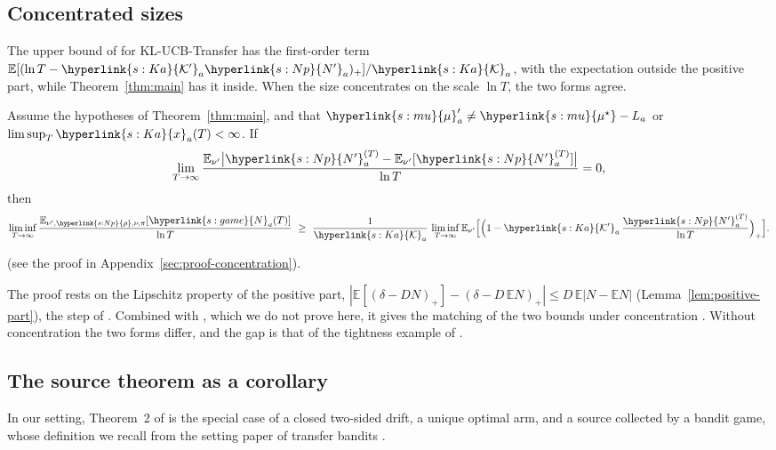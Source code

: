 \documentclass[11pt]{article}
\newcommand{\sy}[2]{\hyperlink{#1}{#2}}
\newcommand{\E}{\mathbb{E}}
\newcommand{\mean}{\sy{s:mu}{\mu}}
\newcommand{\ms}{\sy{s:mu}{\mu^{\star}}}
\newcommand{\Np}{\sy{s:Np}{N'}}
\newcommand{\rhos}{\sy{s:Np}{\rho}}
\newcommand{\Nc}{\sy{s:game}{N}}
\newcommand{\Ka}{\sy{s:Ka}{\mathcal{K}}}
\newcommand{\Kp}{\sy{s:Ka}{\mathcal{K}'}}
\newcommand{\xr}{\sy{s:Ka}{x}}
\begin{document}
\subsection{Concentrated sizes}

The upper bound of \citet[Theorem~3(i)]{PMRM26} for KL-UCB-Transfer has the first-order term
$\E[(\ln T-\Kp_a\Np_a)_+]/\Ka_a$, with the expectation outside the positive part, while
Theorem~\ref{thm:main} has it inside. When the size concentrates on the scale $\ln T$, the two forms
agree.

\begin{corollary}\label{cor:concentration}
Assume the hypotheses of Theorem~\ref{thm:main}, and that $\mean'_a\ne\ms-L_a$ or
$\limsup_T\xr_a(T)<\infty$. If
\begin{equation*}
\lim_{T\to\infty}\frac{\E_{\nu'}\big|\Np^{(T)}_a-\E_{\nu'}[\Np^{(T)}_a]\big|}{\ln T}=0,
\end{equation*}
then
\begin{equation*}
\liminf_{T\to\infty}\frac{\E_{\nu',\rhos,\nu,\pi}[\Nc_a(T)]}{\ln T}\ \ge\
\frac{1}{\Ka_a}\,\liminf_{T\to\infty}\E_{\nu'}\Big[\Big(1-\Kp_a\,\frac{\Np^{(T)}_a}{\ln T}\Big)_+\Big].
\end{equation*}
\end{corollary}
(see the proof in Appendix~\ref{sec:proof-concentration}).

The proof rests on the Lipschitz property of the positive part,
$|\E[(\delta-DN)_+]-(\delta-D\,\E N)_+|\le D\,\E|N-\E N|$ (Lemma~\ref{lem:positive-part}), the step of
\citet[Appendix~D]{PMRM26}. Combined with \citet[Theorem~3]{PMRM26}, which we do not prove here, it
gives the matching of the two bounds under concentration \citep[Proposition~4]{PMRM26}. Without
concentration the two forms differ, and the gap is that of the tightness example of
\citet[Section~4.2]{PMRM26}.

\subsection{The source theorem as a corollary}

In our setting, Theorem~2 of \citet{PMRM26} is the special case of a closed two-sided drift, a
unique optimal arm, and a source collected by a bandit game, whose definition we recall from the
setting paper of transfer bandits \citep[Definition~5.1]{INC-P003}.
\end{document}
